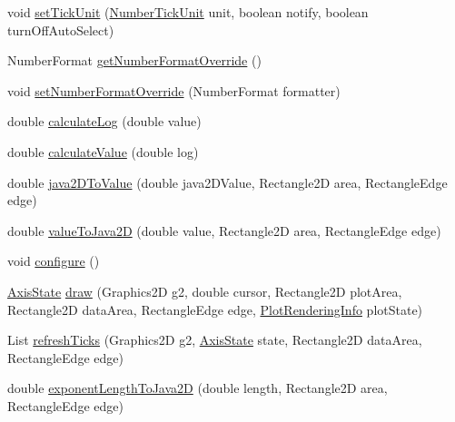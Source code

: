 \begin{DoxyCompactItemize}
void \mbox{\hyperlink{classorg_1_1jfree_1_1chart_1_1axis_1_1_log_axis_a6af77a7f0a87df65e5a769098f7b4be1}{set\+Tick\+Unit}} (\mbox{\hyperlink{classorg_1_1jfree_1_1chart_1_1axis_1_1_number_tick_unit}{Number\+Tick\+Unit}} unit, boolean notify, boolean turn\+Off\+Auto\+Select)
\item 
Number\+Format \mbox{\hyperlink{classorg_1_1jfree_1_1chart_1_1axis_1_1_log_axis_abfe91c2add4820043db00e299893f7ed}{get\+Number\+Format\+Override}} ()
\item 
void \mbox{\hyperlink{classorg_1_1jfree_1_1chart_1_1axis_1_1_log_axis_a6c15f9a9f7b92544be4244bd4df8622b}{set\+Number\+Format\+Override}} (Number\+Format formatter)
\item 
double \mbox{\hyperlink{classorg_1_1jfree_1_1chart_1_1axis_1_1_log_axis_ad0dbcac62b133e033ce54a998eab3bd5}{calculate\+Log}} (double value)
\item 
double \mbox{\hyperlink{classorg_1_1jfree_1_1chart_1_1axis_1_1_log_axis_a9b846dad36da8c9775e3c1016d6f08aa}{calculate\+Value}} (double log)
\item 
double \mbox{\hyperlink{classorg_1_1jfree_1_1chart_1_1axis_1_1_log_axis_a317a0e2e42c5f4a8a3cd44c7e1f89ec3}{java2\+D\+To\+Value}} (double java2\+D\+Value, Rectangle2D area, Rectangle\+Edge edge)
\item 
double \mbox{\hyperlink{classorg_1_1jfree_1_1chart_1_1axis_1_1_log_axis_ab1aacd3683f26699a40660d63f8b687c}{value\+To\+Java2D}} (double value, Rectangle2D area, Rectangle\+Edge edge)
\item 
void \mbox{\hyperlink{classorg_1_1jfree_1_1chart_1_1axis_1_1_log_axis_a445d544d4281258edb33bd61c9f70913}{configure}} ()
\item 
\mbox{\hyperlink{classorg_1_1jfree_1_1chart_1_1axis_1_1_axis_state}{Axis\+State}} \mbox{\hyperlink{classorg_1_1jfree_1_1chart_1_1axis_1_1_log_axis_afa316f42cc412b316e63a953c8e85a77}{draw}} (Graphics2D g2, double cursor, Rectangle2D plot\+Area, Rectangle2D data\+Area, Rectangle\+Edge edge, \mbox{\hyperlink{classorg_1_1jfree_1_1chart_1_1plot_1_1_plot_rendering_info}{Plot\+Rendering\+Info}} plot\+State)
\item 
List \mbox{\hyperlink{classorg_1_1jfree_1_1chart_1_1axis_1_1_log_axis_ab8a547204997be24b389e8da5d23755c}{refresh\+Ticks}} (Graphics2D g2, \mbox{\hyperlink{classorg_1_1jfree_1_1chart_1_1axis_1_1_axis_state}{Axis\+State}} state, Rectangle2D data\+Area, Rectangle\+Edge edge)
\item 
double \mbox{\hyperlink{classorg_1_1jfree_1_1chart_1_1axis_1_1_log_axis_ac523d2a9a7f4d5a745a4c9e40dea5fc4}{exponent\+Length\+To\+Java2D}} (double length, Rectangle2D area, Rectangle\+Edge edge)

\end{DoxyCompactItemize}
